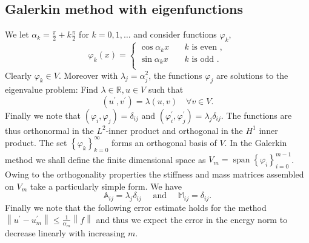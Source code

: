 \documentclass[a4paper,10pt]{article}
\newcommand{\R}{\ensuremath{\mathbb{R}}}
\newcommand{\norm}[1]{\ensuremath{\left\|#1\right\|}}
\newcommand{\inner}[2]{\ensuremath{\left(#1, #2\right)}}
\newcommand{\Amat}{\ensuremath{\mathbb{A}}}
\newcommand{\Mmat}{\ensuremath{\mathbb{M}}}
\DeclareMathOperator{\spn}{span}
\begin{document}
  \subsection{Galerkin method with eigenfunctions}
  We let $\alpha_k=\frac{\pi}{2}+k\frac{\pi}{2}$ for $k=0, 1, \dots$ and
  consider functions $\varphi_k$,
  \[
    \varphi_k(x) = \begin{cases}
                \cos{\alpha_k x} &\quad k \text{ is even },\\
                \sin{\alpha_k x} &\quad k \text{ is odd }.\\
              \end{cases}
  \]
  Clearly $\varphi_k\in V$. Moreover with $\lambda_j=\alpha_j^2$, the functions
  $\varphi_j$ are solutions to the eigenvalue problem: Find $\lambda\in\R, u\in V$
  such that
  \[
    \inner{u^{\prime}}{v^{\prime}} = \lambda \inner{u}{v}\quad\forall v \in V.
  \]
  Finally we note that $\inner{\varphi_i}{\varphi_j}=\delta_{ij}$ and 
  $\inner{\varphi_i^{\prime}}{\varphi_j^{\prime}}=\lambda_j\delta_{ij}$. The
  functions are thus orthonormal in the $L^2$-inner product and orthogonal in
  the $H^1$ inner product. The set $\left\{\varphi_k\right\}_{k=0}^{\infty}$
  forms an orthogonal basis of $V$. In the Galerkin method we shall define the
  finite dimensional space as $V_m=\spn\left\{\varphi_i\right\}_{i=0}^{m-1}$.
  Owing to the orthogonality properties the stiffness and mass matrices
  assembled on $V_m$ take a particularly simple form. We have
  \[
    \Amat_{ij} = \lambda_j\delta_{ij}
    \quad\text{ and }\quad
    \Mmat_{ij} = \delta_{ij}.
  \]
  Finally we note that the following error estimate holds for the method 
  $\norm{u^{\prime}-u_m^{\prime}}\leq \frac{1}{\alpha_m}\norm{f}$ and thus
  we expect the error in the energy norm to decrease linearly with increasing
  $m$.
\end{document}
